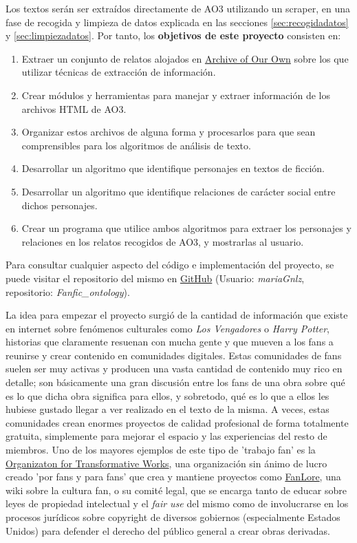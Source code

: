 \documentclass{pre-tfg}
\begin{document}
Los textos serán ser extraídos directamente de AO3 utilizando un scraper, en una fase de recogida y limpieza de datos explicada en las secciones \ref{sec:recogidadatos} y \ref{sec:limpiezadatos}. Por tanto, los \textbf{objetivos de este proyecto} consisten en:

\begin{enumerate}
	\item Extraer un conjunto de relatos alojados en \href{http://wwww.archiveofourown.org}{Archive of Our Own} sobre los que utilizar técnicas de extracción de información.
	\item Crear módulos y herramientas para manejar y extraer información de los archivos HTML de AO3.
	\item Organizar estos archivos de alguna forma y procesarlos para que sean comprensibles para los algoritmos de análisis de texto.
	\item Desarrollar un algoritmo que identifique personajes en textos de ficción.
	\item Desarrollar un algoritmo que identifique relaciones de carácter social entre dichos personajes.
	\item Crear un programa que utilice ambos algoritmos para extraer los personajes y relaciones en los relatos recogidos de AO3, y mostrarlas al usuario.
\end{enumerate}

Para consultar cualquier aspecto del código e implementación del proyecto, se puede visitar el repositorio del mismo en \href{https://www.github.com/mariaGnlz/Fanfic_ontology}{GitHub} (Usuario: \textit{mariaGnlz}, repositorio: \textit{Fanfic\_ontology}).

La idea para empezar el proyecto surgió de la cantidad de información que existe en internet sobre fenómenos culturales como \textit{Los Vengadores} o \textit{Harry Potter}, historias que claramente resuenan con mucha gente y que mueven a los fans a reunirse y crear contenido en comunidades digitales. Estas comunidades de fans suelen ser muy activas y producen una vasta cantidad de contenido muy rico en detalle; son básicamente una gran discusión entre los fans de una obra sobre qué es lo que dicha obra significa para ellos, y sobretodo, qué es lo que a ellos les hubiese gustado llegar a ver realizado en el texto de la misma. A veces, estas comunidades crean enormes proyectos de calidad profesional de forma totalmente gratuita, simplemente para mejorar el espacio y las experiencias del resto de miembros. Uno de los mayores ejemplos de este tipo de 'trabajo fan' es la \href{https://www.transformativeworks.org/}{Organizaton for Transformative Works}, una organización sin ánimo de lucro creado 'por fans y para fans' que crea y mantiene proyectos como \href{https://www.fanlore.org/wiki/Main_Page}{FanLore}, una wiki sobre la cultura fan, o su comité legal, que se encarga tanto de educar sobre leyes de propiedad intelectual y el \textit{fair use} del mismo como de involucrarse en los procesos jurídicos sobre copyright de diversos gobiernos (especialmente Estados Unidos) para defender el derecho del público general a crear obras derivadas.
\end{document}

